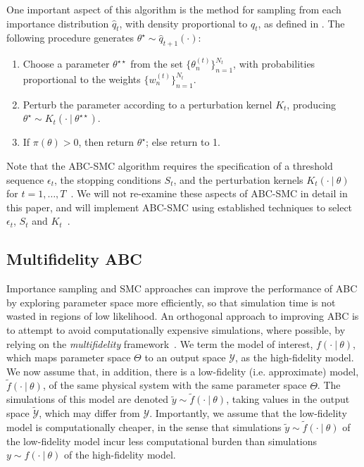 \documentclass[review,demo]{siamonline190516}
\begin{document}
One important aspect of this algorithm is the method for sampling from each importance distribution $\hat q_t$, with density proportional to $q_t$, as defined in .
The following procedure generates $\theta^\star \sim \hat q_{t+1}(\cdot)$:
\begin{enumerate}
\item Choose a parameter $\theta^{\star\star}$ from the set $\{ \theta_n^{(t)} \}_{n=1}^{N_t}$, with probabilities proportional to the weights $\{ w_n^{(t)} \}_{n=1}^{N_t}$.
\item Perturb the parameter according to a perturbation kernel $K_t$, producing $\theta^{\star} \sim K_{t}(\cdot~|~\theta^{\star\star})$.
\item If $\pi(\theta)>0$, then return $\theta^{\star}$; else return to 1.
\end{enumerate}
Note that the ABC-SMC algorithm requires the specification of a threshold sequence $\epsilon_t$, the stopping conditions $S_t$, and the perturbation kernels $K_t(\cdot~|~\theta)$ for $t=1,\dots,T$~\cite{Sisson2018}.
We will not re-examine these aspects of ABC-SMC in detail in this paper, and will implement ABC-SMC using established techniques to select $\epsilon_t$, $S_t$ and $K_t$~\cite{Toni2009,DelMoral2012,Beaumont2009,Filippi2013}.

\subsection{Multifidelity ABC}
\label{s:MFABC}
Importance sampling and SMC approaches can improve the performance of ABC by exploring parameter space more efficiently, so that simulation time is not wasted in regions of low likelihood.
An orthogonal approach to improving ABC is to attempt to avoid computationally expensive simulations, where possible, by relying on the \emph{multifidelity} framework~\cite{Prescott2020}.
We term the model of interest, $f(\cdot~|~\theta)$, which maps parameter space $\Theta$ to an output space $\mathcal Y$, as the high-fidelity model.
We now assume that, in addition, there is a low-fidelity (i.e. approximate) model, $\tilde f(\cdot~|~\theta)$, of the same physical system with the same parameter space $\Theta$.
The simulations of this model are denoted $\tilde y \sim \tilde f(\cdot~|~\theta)$, taking values in the output space $\tilde{\mathcal Y}$, which may differ from $\mathcal Y$.
Importantly, we assume that the low-fidelity model is computationally cheaper, in the sense that simulations $\tilde y \sim \tilde f(\cdot~|~\theta)$ of the low-fidelity model incur less computational burden than simulations $y \sim f(\cdot~|~\theta)$ of the high-fidelity model.
\end{document}
